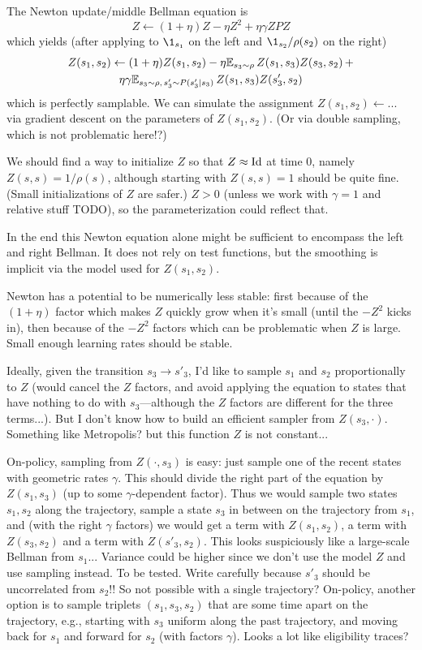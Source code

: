\documentclass[11pt,a4paper]{article}
\begin{document}
The Newton update/middle Bellman equation is
\begin{equation}
Z\gets (1+\eta)Z-\eta Z^2+\eta \gamma ZPZ
\end{equation}
which yields (after applying to $\1_{s_1}$ on the left and $\1_{s_2}/\rho(s_2)$
on the right)
\begin{multline}
Z(s_1,s_2)\gets (1+\eta)Z(s_1,s_2)-\eta \mathbb{E}_{s_3\sim \rho}\,
Z(s_1,s_3)Z(s_3,s_2)\,+\\\eta \gamma \mathbb{E}_{s_3\sim\rho,\, s'_3\sim
P(s'_3|s_3)}\,
Z(s_1,s_3)Z(s'_3,s_2)
\end{multline}
which is perfectly samplable. We can simulate the assignment
$Z(s_1,s_2)\gets...$ via gradient descent on the parameters of
$Z(s_1,s_2)$. (Or via double sampling, which is not problematic here!?)

We should find a way to initialize $Z$ so that $Z\approx \operatorname{Id}$ at time
$0$, namely $Z(s,s)=1/\rho(s)$, although starting with $Z(s,s)=1$ should be
quite fine. (Small initializations of $Z$ are safer.) $Z>0$ (unless we work with $\gamma=1$ and relative stuff
TODO), so the parameterization could reflect that.

In the end this Newton equation alone might be sufficient to
encompass the left and right Bellman. It does not rely on test functions,
but the smoothing is implicit via the model used for $Z(s_1,s_2)$.

Newton has a potential to be numerically less stable: first because of
the $(1+\eta)$ factor which makes $Z$ quickly grow when it's small (until
the $-Z^2$ kicks in), then because of the $-Z^2$ factors which can be
problematic when $Z$ is large. Small enough learning rates should be
stable.

Ideally, given the transition $s_3\to s'_3$, I'd like to sample $s_1$ and
$s_2$ proportionally to $Z$ (would cancel the $Z$ factors, and avoid
applying the equation to states that have nothing to do with
$s_3$—although the $Z$ factors are different for the three terms...). But
I don't know how to build an efficient sampler from $Z(s_3,\cdot)$.
Something like Metropolis? but this function $Z$ is not constant...

On-policy, sampling from $Z(\cdot,s_3)$ is easy: just sample one of the
recent states with geometric rates $\gamma$. This should divide the
right part of the equation by $Z(s_1,s_3)$ (up to some $\gamma$-dependent
factor). Thus we would sample two states $s_1,s_2$ along the trajectory,
sample a state $s_3$ in between on the trajectory from $s_1$, and (with
the right $\gamma$ factors) we would get a term with $Z(s_1,s_2)$, a term
with $Z(s_3,s_2)$ and a term with $Z(s'_3,s_2)$. This looks suspiciously
like a large-scale Bellman from $s_1$... Variance could be higher since
we don't use the model $Z$ and use sampling instead. To be tested. Write
carefully because $s'_3$ should be uncorrelated from $s_2$!! So not
possible with a single
trajectory?
On-policy, another
option is to sample triplets $(s_1,s_3,s_2)$ that are some time apart on
the trajectory, e.g., starting with $s_3$ uniform along the past
trajectory, and moving back for $s_1$ and forward for $s_2$ (with factors
$\gamma$). Looks a lot like eligibility traces?
\end{document}
